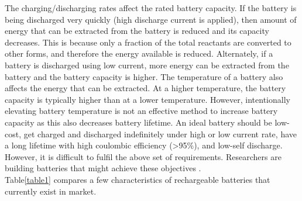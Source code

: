The charging/discharging rates affect the rated battery capacity. If the battery is being discharged very quickly (high discharge current is applied), then amount of energy that can be extracted from the battery is reduced and its capacity decreases. This is because only a fraction of the total reactants are converted to other forms, and therefore the energy available is reduced. Alternately, if a battery is discharged using low current, more energy can be extracted from the battery and the battery capacity is higher. The temperature of a battery also affects the energy that can be extracted. At a higher temperature, the battery capacity is typically higher than at a lower temperature. However, intentionally elevating battery temperature is not an effective method to increase battery capacity as this also decreases battery lifetime. 
An ideal battery should be low-cost, get charged and discharged indefinitely under high or low current rate, have a long lifetime with high coulombic efficiency (>95\%), and low-self discharge. However, it is difficult to fulfil the above set of requirements. Researchers are building batteries that might achieve these objectives \cite{slater_sodium-ion_2013,jian_carbon_2015,aurbach_prototype_2000,lin_ultrafast_2015-2}. \\

Table\ref{table1} compares a few characteristics of rechargeable batteries that currently exist in market. 

